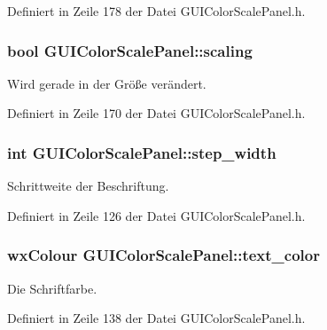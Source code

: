 Definiert in Zeile 178 der Datei G\-U\-I\-Color\-Scale\-Panel.\-h.

\hypertarget{classGUIColorScalePanel_aec005c07c64a17ffe6d362f4de0a04b1}{
\subsubsection[{scaling}]{\setlength{\rightskip}{0pt plus 5cm}bool G\-U\-I\-Color\-Scale\-Panel\-::scaling\hspace{0.3cm}{\ttfamily [private]}}}\label{classGUIColorScalePanel_aec005c07c64a17ffe6d362f4de0a04b1}
Wird gerade in der Größe verändert. 

Definiert in Zeile 170 der Datei G\-U\-I\-Color\-Scale\-Panel.\-h.

\hypertarget{classGUIColorScalePanel_a5f9789cc727854594c7d29c392578427}{
\subsubsection[{step\-\_\-width}]{\setlength{\rightskip}{0pt plus 5cm}int G\-U\-I\-Color\-Scale\-Panel\-::step\-\_\-width\hspace{0.3cm}{\ttfamily [private]}}}\label{classGUIColorScalePanel_a5f9789cc727854594c7d29c392578427}
Schrittweite der Beschriftung. 

Definiert in Zeile 126 der Datei G\-U\-I\-Color\-Scale\-Panel.\-h.

\hypertarget{classGUIColorScalePanel_a48e282e7a3bfff30894e9e6edfd120dc}{
\subsubsection[{text\-\_\-color}]{\setlength{\rightskip}{0pt plus 5cm}wx\-Colour G\-U\-I\-Color\-Scale\-Panel\-::text\-\_\-color\hspace{0.3cm}{\ttfamily [private]}}}\label{classGUIColorScalePanel_a48e282e7a3bfff30894e9e6edfd120dc}
Die Schriftfarbe. 

Definiert in Zeile 138 der Datei G\-U\-I\-Color\-Scale\-Panel.\-h.

